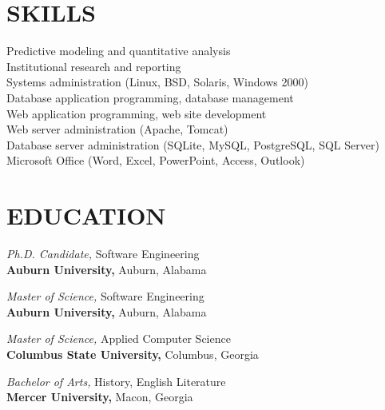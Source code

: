 \documentclass[margin, 11pt]{res} %
\begin{document}
\begin{resume}

 
\section{SKILLS}  

Predictive modeling and quantitative analysis\\
Institutional research and reporting\\
Systems administration (Linux, BSD, Solaris, Windows 2000)\\
Database application programming, database management\\
Web application programming, web site development\\
Web server administration (Apache, Tomcat)\\
Database server administration (SQLite, MySQL, PostgreSQL, SQL Server)\\
Microsoft Office (Word, Excel, PowerPoint, Access, Outlook)\\


\section{EDUCATION}

{\it Ph.D. Candidate,} Software Engineering\\
\textbf{Auburn University,} Auburn, Alabama

{\it Master of Science,} Software Engineering\\
\textbf{Auburn University,} Auburn, Alabama

{\it Master of Science,} Applied Computer Science\\
\textbf{Columbus State University,} Columbus, Georgia

{\it Bachelor of Arts,} History, English Literature\\
\textbf{Mercer University,} Macon, Georgia

 

\end{resume}
\end{document}
